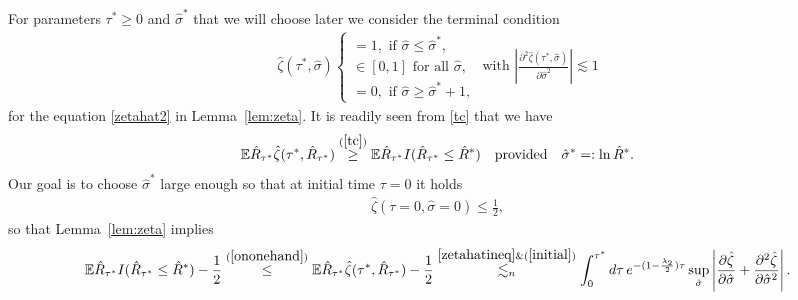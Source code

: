 \documentclass[english, letterpaper,12pt,reqno]{amsart}
\theoremstyle{remark}
\theoremstyle{plain}
\newcommand{\1}{\mathbf{1}}
\def\bbE{\mathbb E}
\begin{document}
For parameters $ \tau^*  \geq 0 $ and $ \hat{\sigma}^* $ that we will choose later we consider the terminal condition
%
\begin{align}\label{tc}
    \hat{\zeta}( \tau^*,\hat{\sigma})\begin{cases}
        = 1, \text{ if } \hat{\sigma} \leq \hat{\sigma}^*,\\
        \in [0,1] \text{ for all } \hat{\sigma},\\
        =0, \text{ if }\hat{\sigma}\geq \hat{\sigma}^*+1,
    \end{cases}
 \text{ with } \left| \frac{\partial^2 \hat{\zeta}( \tau^* ,\hat{\sigma}) }{\partial \hat{\sigma}^2}\right| \lesssim 1
 \end{align}
 for the equation \eqref{zetahat2} in Lemma~\ref{lem:zeta}.
It is readily seen from \eqref{tc} that we have
 \begin{align}
\bbE \hat R_{ \tau^* } \hat{\zeta}(\tau^*, \hat R_{ \tau^* }) \stackrel{ (\ref{tc}) }{ \geq } \bbE \hat R_{ \tau^* } I( \hat R_{ \tau^* } \leq \hat{R}^*) 
\quad \text{provided} \quad \hat\sigma^* =: \ln \hat R^{ * }. \label{ononehand}
\end{align}
%
Our goal is to choose $ \hat\sigma^* $ large enough so that at initial time $ \tau = 0 $ it holds
%
\begin{align}\hat{\zeta}( \tau=0, \hat\sigma = 0 ) \leq \frac{1}{2} , \label{initial}
\end{align}
%
so that Lemma~\ref{lem:zeta} implies
%
\begin{align}
 \bbE \hat R_{ \tau^* } I( \hat R_{ \tau^* } \leq \hat{R}^*) - \frac{ 1 }{ 2 }
 \stackrel{ (\ref{ononehand}) }{ \leq } \bbE   \hat{R}_{ \tau^* } \hat{\zeta}( \tau^*, \hat R_{ \tau^* }) - \frac{ 1 }{ 2 }
 \stackrel{ \eqref{zetahatineq} \& (\ref{initial}) }{ \lesssim_{ n } } \int_0^{\tau^*}d \tau\,  e^{ -  ( 1 - \frac{ \lambda_2 }{ 2 }) \tau}  \sup_{\hat \sigma}\left|\frac{\partial \hat \zeta}{\partial\hat \sigma}+ \frac{\partial^2 \hat \zeta}{\partial\hat \sigma^2} \right|  . \label{zetahatineqb}
\end{align}
%
\end{document}

